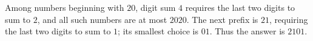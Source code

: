 Among numbers beginning with $20$, digit sum $4$ requires the last two digits to sum to $2$, and all such numbers are at most $2020$. The next prefix is $21$, requiring the last two digits to sum to $1$; its smallest choice is $01$. Thus the answer is $\boxed{2101}$.
